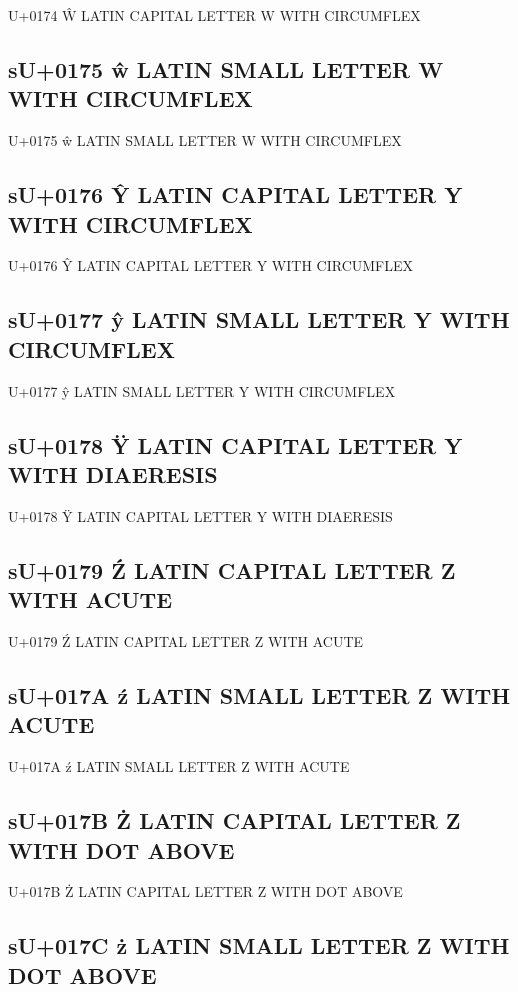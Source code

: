 U+0174 Ŵ  LATIN CAPITAL LETTER W WITH CIRCUMFLEX

\subsection{sU+0175 ŵ  LATIN SMALL LETTER W WITH CIRCUMFLEX}

U+0175 ŵ  LATIN SMALL LETTER W WITH CIRCUMFLEX

\subsection{sU+0176 Ŷ  LATIN CAPITAL LETTER Y WITH CIRCUMFLEX}

U+0176 Ŷ  LATIN CAPITAL LETTER Y WITH CIRCUMFLEX

\subsection{sU+0177 ŷ  LATIN SMALL LETTER Y WITH CIRCUMFLEX}

U+0177 ŷ  LATIN SMALL LETTER Y WITH CIRCUMFLEX

\subsection{sU+0178 Ÿ  LATIN CAPITAL LETTER Y WITH DIAERESIS}

U+0178 Ÿ  LATIN CAPITAL LETTER Y WITH DIAERESIS

\subsection{sU+0179 Ź  LATIN CAPITAL LETTER Z WITH ACUTE}

U+0179 Ź  LATIN CAPITAL LETTER Z WITH ACUTE

\subsection{sU+017A ź  LATIN SMALL LETTER Z WITH ACUTE}

U+017A ź  LATIN SMALL LETTER Z WITH ACUTE

\subsection{sU+017B Ż  LATIN CAPITAL LETTER Z WITH DOT ABOVE}

U+017B Ż  LATIN CAPITAL LETTER Z WITH DOT ABOVE

\subsection{sU+017C ż  LATIN SMALL LETTER Z WITH DOT ABOVE}

